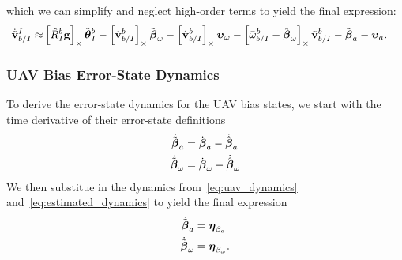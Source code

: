 which we can simplify and neglect high-order terms to yield the final
expression:
\begin{align}
  \dot{\tilde{\boldsymbol{\mathrm{v}}}}_{b/I}^I
  \approx&
  \left[  \hat{R}_I^b \boldsymbol{\mathrm{g}}  \right]_{\times} \tilde{\boldsymbol{\mathrm{\theta}}}_I^b 
  -
  \left[  \hat{\boldsymbol{\mathrm{v}}}_{b/I}^b  \right]_{\times} \tilde{\boldsymbol{\mathrm{\beta}}}_\omega
  -
  \left[  \hat{\boldsymbol{\mathrm{v}}}_{b/I}^b  \right]_{\times} \boldsymbol{\mathrm{\upsilon}}_\omega
  -
  \left[  \bar{\omega}_{b/I}^b - \hat{\boldsymbol{\mathrm{\beta}}}_\omega  \right]_{\times}
  \tilde{\boldsymbol{\mathrm{v}}}_{b/I}^b
  -
  \tilde{\boldsymbol{\mathrm{\beta}}}_a
  -
  \boldsymbol{\mathrm{\upsilon}}_a.
\end{align}

\subsubsection{UAV Bias Error-State Dynamics}
To derive the error-state dynamics for the UAV bias states, we start with the
time derivative of their error-state definitions
\begin{align}
  \dot{\tilde{\boldsymbol{\mathrm{\beta}}}}_a &= \dot{\boldsymbol{\mathrm{\beta}}}_a -
  \dot{\hat{\boldsymbol{\mathrm{\beta}}}}_a \\
  \dot{\tilde{\boldsymbol{\mathrm{\beta}}}}_\omega &= \dot{\boldsymbol{\mathrm{\beta}}}_\omega -
  \dot{\hat{\boldsymbol{\mathrm{\beta}}}}_\omega
\end{align}
We then substitue in the dynamics from~\eqref{eq:uav_dynamics}
and~\eqref{eq:estimated_dynamics} to yield the final expression
\begin{align}
  \dot{\tilde{\boldsymbol{\mathrm{\beta}}}}_a &= \boldsymbol{\mathrm{\eta}}_{\beta_a} \\
  \dot{\tilde{\boldsymbol{\mathrm{\beta}}}}_\omega &= \boldsymbol{\mathrm{\eta}}_{\beta_\omega}.
\end{align}

